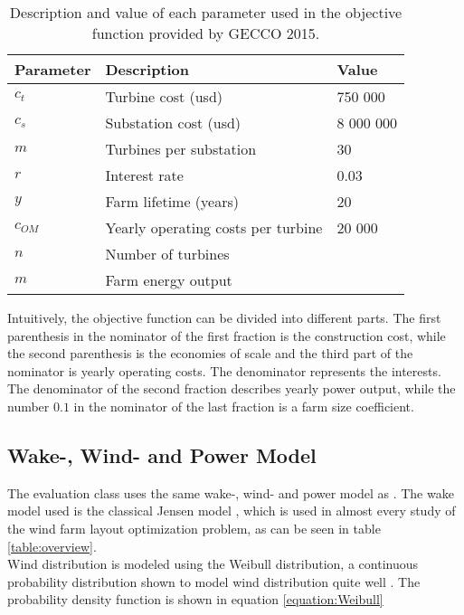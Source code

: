 \begin{table}[h!]
\begin{center}
\caption{Description and value of each parameter used in the objective function provided by GECCO 2015.}
\label{Parameters}
\begin{tabular}{l|l|l}
\textbf{Parameter} & \textbf{Description} & \textbf{Value} \\ 
\hline 
$c_t$ & Turbine cost (usd) & 750 000 \\ 
$c_s$ & Substation cost (usd) & 8 000 000 \\ 
$m$ & Turbines per substation & 30 \\ 
$r$ & Interest rate & 0.03 \\ 
$y$ & Farm lifetime (years) & 20 \\ 
$c_{OM}$ & Yearly operating costs per turbine & 20 000 \\ 
$n$ & Number of turbines &  \\ 
$m$ & Farm energy output &  \\  
\end{tabular} 
\end{center}
\end{table}


\noindent Intuitively, the objective function can be divided into different parts. The first parenthesis in the nominator of the first fraction is the construction cost, while the second parenthesis is the economies of scale and the third part of the nominator is yearly operating costs. The denominator represents the interests. The denominator of the second fraction describes yearly power output, while the number $0.1$ in the nominator of the last fraction is a farm size coefficient. \\



\subsection{Wake-, Wind- and Power Model}\label{subsection:wakewindpower}
The evaluation class uses the same wake-, wind- and power model as \cite{Kusiak}. The wake model used is the classical Jensen model \citep{Jensen}, which is used in almost every study of the wind farm layout optimization problem, as can be seen in table \ref{table:overview}. \\

\noindent Wind distribution is modeled using the Weibull distribution, a continuous probability distribution shown to model wind distribution quite well \citep{Justus}. The probability density function is shown in equation \ref{equation:Weibull}



